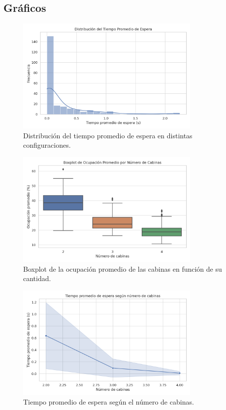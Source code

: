 \documentclass[12pt]{article}
\begin{document}
\subsection*{Gráficos}
\begin{figure}[H]
\centering
\includegraphics[width=0.8\textwidth]{hist_espera.png}
\caption{Distribución del tiempo promedio de espera en distintas configuraciones.}
\end{figure}

\begin{figure}[H]
\centering
\includegraphics[width=0.8\textwidth]{box_ocupacion.png}
\caption{Boxplot de la ocupación promedio de las cabinas en función de su cantidad.}
\end{figure}

\begin{figure}[H]
\centering
\includegraphics[width=0.8\textwidth]{line_espera.png}
\caption{Tiempo promedio de espera según el número de cabinas.}
\end{figure}
\end{document}
